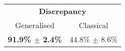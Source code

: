 \begin{tabular}{cc}
\toprule
\multicolumn{2}{c}{\textbf{Discrepancy}} \\
Generalised &  Classical \\
\midrule
\textbf{91.9\% $\pm$ 2.4\%} & 44.8\% $\pm$ 8.6\% \\
\bottomrule
\end{tabular}
